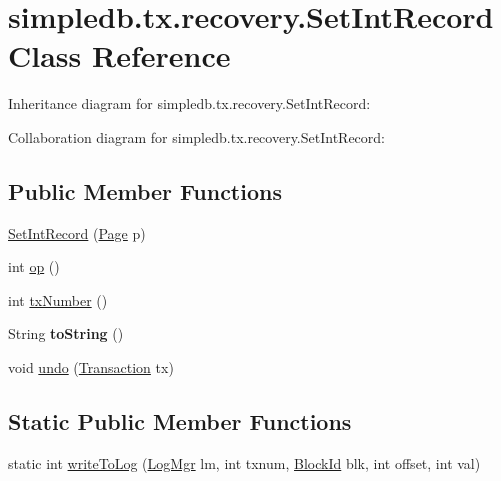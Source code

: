 \hypertarget{classsimpledb_1_1tx_1_1recovery_1_1SetIntRecord}{}\section{simpledb.\+tx.\+recovery.\+Set\+Int\+Record Class Reference}
\label{classsimpledb_1_1tx_1_1recovery_1_1SetIntRecord}


Inheritance diagram for simpledb.\+tx.\+recovery.\+Set\+Int\+Record\+:


Collaboration diagram for simpledb.\+tx.\+recovery.\+Set\+Int\+Record\+:
\subsection*{Public Member Functions}
\begin{DoxyCompactItemize}
\item 
\hyperlink{classsimpledb_1_1tx_1_1recovery_1_1SetIntRecord_ac9b9bab039307fe4b496498d207e4c53}{Set\+Int\+Record} (\hyperlink{classsimpledb_1_1file_1_1Page}{Page} p)
\item 
int \hyperlink{classsimpledb_1_1tx_1_1recovery_1_1SetIntRecord_a8e244e4c544a8253c802931f463c139d}{op} ()
\item 
int \hyperlink{classsimpledb_1_1tx_1_1recovery_1_1SetIntRecord_aaadefbf9f55cefb7308df960c329a21e}{tx\+Number} ()
\item 
\mbox{\label{classsimpledb_1_1tx_1_1recovery_1_1SetIntRecord_a96c76296a645d84addeb1a21c73c8494}} 
String {\bfseries to\+String} ()
\item 
void \hyperlink{classsimpledb_1_1tx_1_1recovery_1_1SetIntRecord_a917897bef9acb164bed44eb6655f6835}{undo} (\hyperlink{classsimpledb_1_1tx_1_1Transaction}{Transaction} tx)
\end{DoxyCompactItemize}
\subsection*{Static Public Member Functions}
\begin{DoxyCompactItemize}
\item 
static int \hyperlink{classsimpledb_1_1tx_1_1recovery_1_1SetIntRecord_a535ee3773e4ab25a84fe770e1953d6c4}{write\+To\+Log} (\hyperlink{classsimpledb_1_1log_1_1LogMgr}{Log\+Mgr} lm, int txnum, \hyperlink{classsimpledb_1_1file_1_1BlockId}{Block\+Id} blk, int offset, int val)
\end{DoxyCompactItemize}
